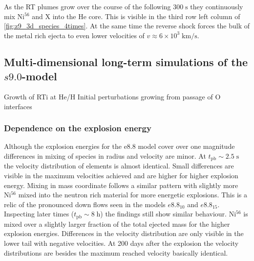\documentclass[fleqn,usenatbib]{mnras}
\newcommand{\nickel}{$\mathrm{Ni^{56}}$\xspace}
\newcommand{\tracer}{$\mathrm{X}$\xspace}
\newcommand{\COM}[1]{{\color{red}#1}}
\begin{document}
As the RT plumes grow over the course of the following $300\;\mathrm{s}$ they continuously mix \nickel and \tracer into the He core. This is visible in the third row left column of \autoref{fig:z9_3d_species_4times}. At the same time the reverse shock forces the bulk of the metal rich ejecta to even lower velocities of  $v\approx 6\times10^3\;\mathrm{km/s}$. 

\subsection{Multi-dimensional long-term simulations of the $s9.0$-model}
\label{subsec:Multi-dimensional long-term simulations of the s9.0-model}
\COM{Growth of RTi at He/H}
\COM{Initial perturbations growing from passage of O interfaces}

\subsubsection{Dependence on the explosion energy}
\label{subsec:Dependence on the explosion energy}
Although the explosion energies for the e8.8 model cover over one magnitude differences in mixing of species in radius and velocity are minor. At $t_{\mathrm{pb}}\sim 2.5 \;\mathrm{s}$ the velocity distribution of elements is almost identical. Small differences are visible in the maximum velocities achieved and are higher for higher explosion energy. Mixing in mass coordinate follows a similar pattern with slightly more \nickel mixed into the neutron rich material for more energetic explosions. This is a relic of the pronounced down flows seen in the models $e8.8_{10}$ and $e8.8_{15}$. 
Inspecting later times ($t_{\mathrm{pb}}\sim 8 \;\mathrm{h}$) the findings still show similar behaviour. \nickel is mixed over a slightly larger fraction of the total ejected mass for the higher explosion energies. Differences in the velocity distribution are only visible in the lower tail with negative velocities. 
At 200 days after the explosion the velocity distributions are besides the maximum reached velocity basically identical.
\end{document}
